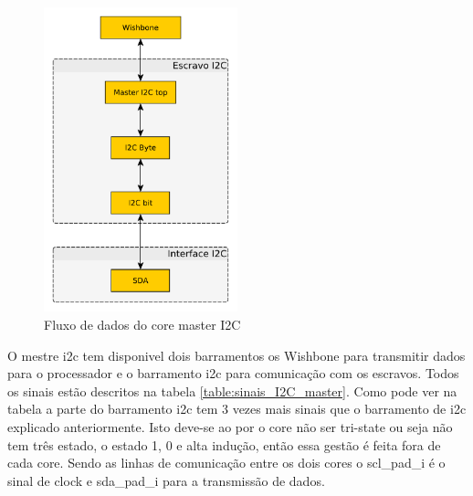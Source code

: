 \begin{figure}[!htb]
  \centering
  \includegraphics[width=0.50\textwidth]{grafos/diagrama_I2C_master.pdf}
  \caption[Fluxo de dados do core mastre I2C]{Fluxo de dados do core master I2C}
  \label{fig:fluxo_I2C_master}
\end{figure}

O mestre \acrshort{i2c} tem disponivel dois barramentos os Wishbone para transmitir dados para o processador e o barramento \acrshort{i2c} para comunicação com os escravos. Todos os sinais estão descritos na tabela \ref{table:sinais_I2C_master}. Como pode ver na tabela a parte do barramento \acrshort{i2c} tem 3 vezes mais sinais que o barramento de \acrshort{i2c} explicado anteriormente. Isto deve-se ao por o core não ser tri-state ou seja não tem três estado, o estado 1, 0 e alta indução, então essa gestão é feita fora de cada core. Sendo as linhas de comunicação entre os dois cores o scl\_pad\_i é o sinal de clock e sda\_pad\_i para a transmissão de dados. 

